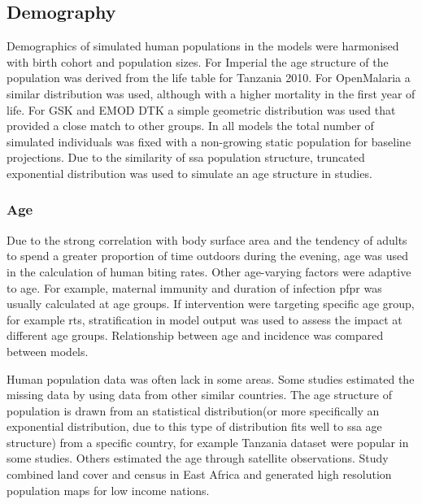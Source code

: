 \documentclass[a4paper, 12pt, twoside]{article}
\begin{document}
\subsection{Demography}
Demographics of simulated human populations in the models were harmonised with birth cohort and population sizes.
For Imperial the age structure of the population was derived from the life table for Tanzania 2010.
For OpenMalaria a similar distribution was used, although with a higher mortality in the first year of life.
For GSK and EMOD DTK a simple geometric distribution was used that provided a close match to other groups.
In all models the total number of simulated individuals was fixed with a non-growing static population for baseline projections.
Due to the similarity of \gls{ssa} population structure, truncated exponential distribution was used to simulate an age structure in studies\cite{White2018b}.

\subsubsection{Age}
Due to the strong correlation with body surface area and the tendency of adults to spend a greater proportion of time outdoors during the evening, age was used in the calculation of human biting rates.
Other age-varying factors were adaptive to age. For example, maternal immunity and duration of infection \gls{pfpr} was usually calculated at age groups.
If intervention were targeting specific age group, for example \gls{rts}, stratification in model output was used to assess the impact at different age groups.
Relationship between age and incidence was compared between models.

Human population data was often lack in some areas.
Some studies estimated the missing data by using data from other similar countries.
The age structure of population is drawn from an statistical distribution(or more specifically an exponential distribution, due to this type of distribution fits well to \gls{ssa} age structure) from a specific country, for example Tanzania dataset\cite{Sherrard-Smith2018b} were popular in some studies.
Others\cite{Adimi2010} estimated the age through satellite observations.
Study combined land cover and census in East Africa and generated high resolution population maps for low income nations.
\end{document}
